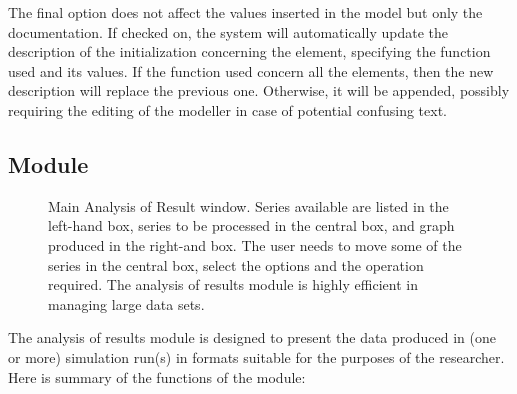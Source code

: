 \documentclass [11pt,a4paper] {book}
\begin{document}
The final option  does not affect the values inserted in the model but only the documentation. If checked on, the system will automatically update the description of the initialization concerning the element, specifying the function used and its values. If the function used concern all the elements, then the new description will replace the previous one. Otherwise, it will be appended, possibly requiring the editing of the modeller in case of potential confusing text.



\subsection{Module }

\begin{figure}[ht]
  \centering
  \caption{\small Main Analysis of Result window. Series available are listed in the left-hand box, series to be processed in the central box, and graph produced in the right-and box. The user needs to move some of the series in the central box, select the options and the operation required. The analysis of results module is highly efficient in managing large data sets.}
  \label{fig:anaresult}
\end{figure}



The analysis of results module is designed to present the data produced in (one or more) simulation run(s) in formats suitable for the purposes of the researcher. Here is summary of the functions of the module:
\end{document}
